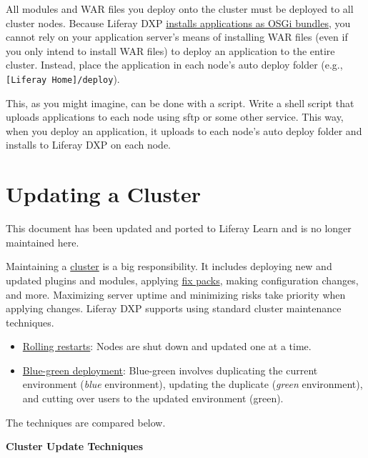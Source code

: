 All modules and WAR files you deploy onto the cluster must be deployed
to all cluster nodes. Because Liferay DXP
\href{/docs/7-2/customization/-/knowledge_base/c/deploying-wars-wab-generator}{installs
applications as OSGi bundles}, you cannot rely on your application
server's means of installing WAR files (even if you only intend to
install WAR files) to deploy an application to the entire cluster.
Instead, place the application in each node's auto deploy folder (e.g.,
\texttt{{[}Liferay\ Home{]}/deploy}).

This, as you might imagine, can be done with a script. Write a shell
script that uploads applications to each node using sftp or some other
service. This way, when you deploy an application, it uploads to each
node's auto deploy folder and installs to Liferay DXP on each node.

\chapter{Updating a Cluster}\label{updating-a-cluster}

{This document has been updated and ported to Liferay Learn and is no
longer maintained here.}

Maintaining a
\href{/docs/7-2/deploy/-/knowledge_base/d/liferay-clustering}{cluster}
is a big responsibility. It includes deploying new and updated plugins
and modules, applying
\href{/docs/7-2/deploy/-/knowledge_base/d/maintaining-liferay}{fix
packs}, making configuration changes, and more. Maximizing server uptime
and minimizing risks take priority when applying changes. Liferay DXP
supports using standard cluster maintenance techniques.

\begin{itemize}
\tightlist
\item
  \href{/docs/7-2/deploy/-/knowledge_base/d/using-rolling-restarts}{Rolling
  restarts}: Nodes are shut down and updated one at a time.
\item
  \href{/docs/7-2/deploy/-/knowledge_base/d/other-cluster-update-techniques}{Blue-green
  deployment}: Blue-green involves duplicating the current environment
  (\emph{blue} environment), updating the duplicate (\emph{green}
  environment), and cutting over users to the updated environment
  (green).
\end{itemize}

The techniques are compared below.

\textbf{Cluster Update Techniques}

\noindent\hrulefill

